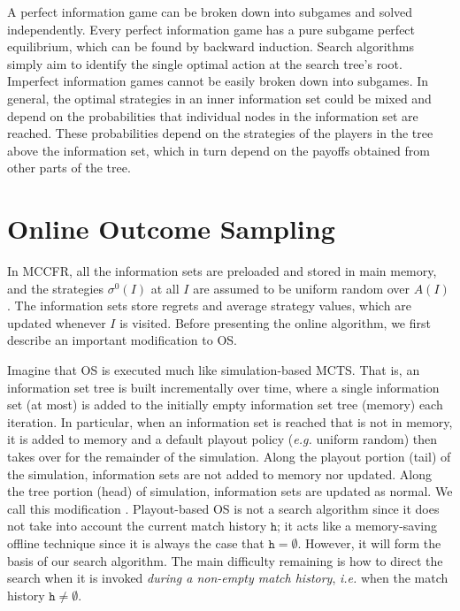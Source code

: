 \documentclass[letterpaper]{article}
\newcommand{\tth}{\mathtt{h}}
\newcommand{\defword}[1]{\textbf{\boldmath{#1}}}
\newcommand{\ie}{{\it i.e.}\xspace}
\newcommand{\eg}{{\it e.g.}\xspace}
\begin{document}

A perfect information game can be broken down into subgames and solved independently. 
Every perfect information game has a pure subgame perfect equilibrium, which can be found by backward induction. 
Search algorithms simply aim to identify the single optimal action at the search tree's root. 
Imperfect information games cannot be easily broken down into subgames. In general, the optimal strategies in an inner 
information set could be mixed and depend on the probabilities that individual nodes in the information set are 
reached. These probabilities depend on the strategies of the players in the tree above the information set, which in 
turn depend on the payoffs obtained from other parts of the tree. 


\section{Online Outcome Sampling}


In MCCFR, all the information sets are preloaded and stored in main memory, and
the strategies $\sigma^0(I)$ at all $I$ are assumed to be uniform random over $A(I)$. The information sets store regrets and average strategy 
values, which are updated whenever $I$ is visited. Before presenting the online algorithm, we first describe an important modification to OS.

Imagine that OS is executed much like simulation-based MCTS. That is, an information set tree is built incrementally over 
time, where a single information set (at most) is added to the initially empty information set tree (memory) each iteration. In 
particular, when an information set is reached that is not in memory, it is added to memory and a default playout policy 
(\eg uniform random) then takes over for the remainder of the simulation. Along the playout portion (tail) of the simulation,  
information sets are not added to memory nor updated. Along the tree portion (head) of simulation, information sets are updated as normal. 
We call this modification \defword{playout-based outcome sampling}. 
Playout-based OS is not a search algorithm since it does not take into account the current match history $\tth$; 
it acts like a memory-saving offline technique since it is always the case that $\tth = \emptyset$.
However, it will form the basis of our search algorithm. 
The main difficulty remaining is how to direct the search when it is invoked {\it during a non-empty match history}, 
\ie when the match history $\tth \not= \emptyset$. 
\end{document}
